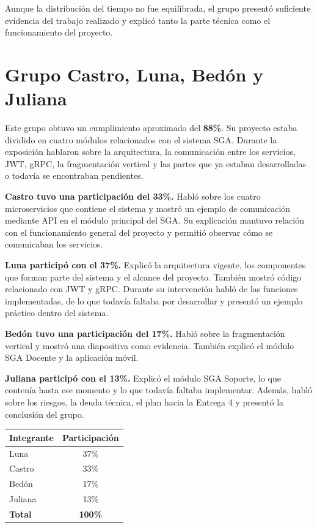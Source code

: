 \documentclass[12pt]{article}
\begin{document}
Aunque la distribución del tiempo no fue equilibrada, el grupo presentó suficiente evidencia del trabajo realizado y explicó tanto la parte técnica como el funcionamiento del proyecto.

\newpage
\section*{Grupo Castro, Luna, Bedón y Juliana}

Este grupo obtuvo un cumplimiento aproximado del \textbf{88\%}. Su proyecto estaba dividido en cuatro módulos relacionados con el sistema SGA. Durante la exposición hablaron sobre la arquitectura, la comunicación entre los servicios, JWT, gRPC, la fragmentación vertical y las partes que ya estaban desarrolladas o todavía se encontraban pendientes.

\textbf{Castro tuvo una participación del 33\%.} Habló sobre los cuatro microservicios que contiene el sistema y mostró un ejemplo de comunicación mediante API en el módulo principal del SGA. Su explicación mantuvo relación con el funcionamiento general del proyecto y permitió observar cómo se comunicaban los servicios.

\textbf{Luna participó con el 37\%.} Explicó la arquitectura vigente, los componentes que forman parte del sistema y el alcance del proyecto. También mostró código relacionado con JWT y gRPC. Durante su intervención habló de las funciones implementadas, de lo que todavía faltaba por desarrollar y presentó un ejemplo práctico dentro del sistema.

\textbf{Bedón tuvo una participación del 17\%.} Habló sobre la fragmentación vertical y mostró una diapositiva como evidencia. También explicó el módulo SGA Docente y la aplicación móvil.

\textbf{Juliana participó con el 13\%.} Explicó el módulo SGA Soporte, lo que contenía hasta ese momento y lo que todavía faltaba implementar. Además, habló sobre los riesgos, la deuda técnica, el plan hacia la Entrega 4 y presentó la conclusión del grupo.

\begin{center}
\begin{tabular}{lc}
\toprule
\textbf{Integrante} & \textbf{Participación} \\
\midrule
Luna & 37\% \\
Castro & 33\% \\
Bedón & 17\% \\
Juliana & 13\% \\
\midrule
\textbf{Total} & \textbf{100\%} \\
\bottomrule
\end{tabular}
\end{center}
\end{document}
